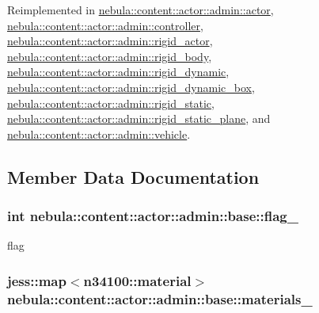 Reimplemented in \hyperlink{classnebula_1_1content_1_1actor_1_1admin_1_1actor_a9290e8e1981731fe362d3995cf010514}{nebula::content::actor::admin::actor}, \hyperlink{classnebula_1_1content_1_1actor_1_1admin_1_1controller_ac86d7c729afb23839db48bde2e52dcc6}{nebula::content::actor::admin::controller}, \hyperlink{classnebula_1_1content_1_1actor_1_1admin_1_1rigid__actor_a3c0adb150e7bfb43c209e6dc102253a5}{nebula::content::actor::admin::rigid\_\-actor}, \hyperlink{classnebula_1_1content_1_1actor_1_1admin_1_1rigid__body_aacabe8d617dd48c2ffec43edae75553d}{nebula::content::actor::admin::rigid\_\-body}, \hyperlink{classnebula_1_1content_1_1actor_1_1admin_1_1rigid__dynamic_a2bf9e18773b7db87cb35fef56274405a}{nebula::content::actor::admin::rigid\_\-dynamic}, \hyperlink{classnebula_1_1content_1_1actor_1_1admin_1_1rigid__dynamic__box_ad0c1ca664351042f80ede5ed0a5bba0a}{nebula::content::actor::admin::rigid\_\-dynamic\_\-box}, \hyperlink{classnebula_1_1content_1_1actor_1_1admin_1_1rigid__static_af7ecdabc256260e8ae07436b3bc4854f}{nebula::content::actor::admin::rigid\_\-static}, \hyperlink{classnebula_1_1content_1_1actor_1_1admin_1_1rigid__static__plane_ad14b9160b7c1aa9ae29d52141d1b6221}{nebula::content::actor::admin::rigid\_\-static\_\-plane}, and \hyperlink{classnebula_1_1content_1_1actor_1_1admin_1_1vehicle_afbb178d770e59c7d211df86d63bb9303}{nebula::content::actor::admin::vehicle}.

\subsection{Member Data Documentation}
\hypertarget{classnebula_1_1content_1_1actor_1_1admin_1_1base_a1f97db269a3759147bdea9569f0ef32b}{
\subsubsection[{flag\_\-}]{\setlength{\rightskip}{0pt plus 5cm}int {\bf nebula::content::actor::admin::base::flag\_\-}}}
\label{classnebula_1_1content_1_1actor_1_1admin_1_1base_a1f97db269a3759147bdea9569f0ef32b}


flag \hypertarget{classnebula_1_1content_1_1actor_1_1admin_1_1base_a2b681d778058ae40a0bcfc4f833c1788}{
\subsubsection[{materials\_\-}]{\setlength{\rightskip}{0pt plus 5cm}jess::map$<${\bf n34100::material}$>$ {\bf nebula::content::actor::admin::base::materials\_\-}}}
\label{classnebula_1_1content_1_1actor_1_1admin_1_1base_a2b681d778058ae40a0bcfc4f833c1788}



